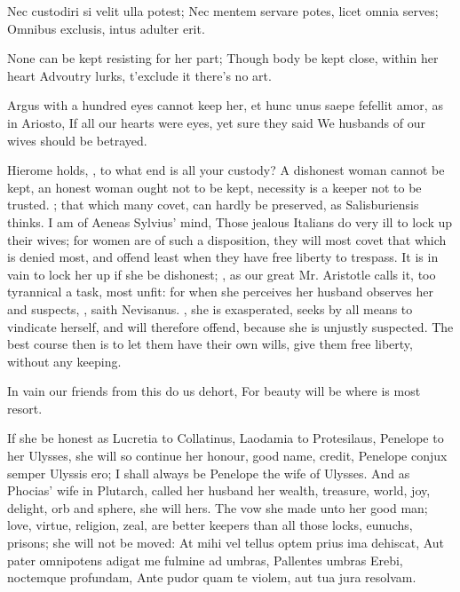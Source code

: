 {Nec custodiri si velit ulla potest;
Nec mentem servare potes, licet omnia serves;
Omnibus exclusis, intus adulter erit.

None can be kept resisting for her part;
Though body be kept close, within her heart
Advoutry lurks, t'exclude it there's no art.

Argus with a hundred eyes cannot keep her, et hunc unus saepe fefellit
amor, as in Ariosto,
If all our hearts were eyes, yet sure they said
We husbands of our wives should be betrayed.

Hierome holds, , to what end is all your
custody? A dishonest woman cannot be kept, an honest woman ought not to
be kept, necessity is a keeper not to be trusted. ; that which many covet, can hardly be preserved, as
 Salisburiensis thinks. I am of Aeneas Sylvius' mind, Those
jealous Italians do very ill to lock up their wives; for women are of
such a disposition, they will most covet that which is denied most, and
offend least when they have free liberty to trespass. It is in vain to
lock her up if she be dishonest; , as our great
Mr. Aristotle calls it, too tyrannical a task, most unfit: for when she
perceives her husband observes her and suspects, , saith
Nevisanus. , she is
exasperated, seeks by all means to vindicate herself, and will
therefore offend, because she is unjustly suspected. The best course
then is to let them have their own wills, give them free liberty,
without any keeping.

In vain our friends from this do us dehort,
For beauty will be where is most resort.

If she be honest as Lucretia to Collatinus, Laodamia to Protesilaus,
Penelope to her Ulysses, she will so continue her honour, good name,
credit, Penelope conjux semper Ulyssis ero; I shall always be Penelope
the wife of Ulysses. And as Phocias' wife in Plutarch, called her
husband her wealth, treasure, world, joy, delight, orb and sphere, she
will hers. The vow she made unto her good man; love, virtue, religion,
zeal, are better keepers than all those locks, eunuchs, prisons; she
will not be moved:
At mihi vel tellus optem prius ima dehiscat,
Aut pater omnipotens adigat me fulmine ad umbras,
Pallentes umbras Erebi, noctemque profundam,
Ante pudor quam te violem, aut tua jura resolvam.

}
